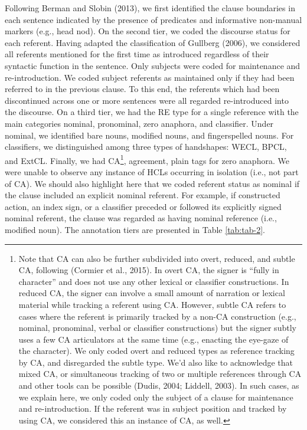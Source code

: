 \documentclass[]{elsarticle} %
\begin{document}
Following Berman and Slobin (2013), we first identified the clause
boundaries in each sentence indicated by the presence of predicates and
informative non-manual markers (e.g., head nod). On the second tier, we
coded the discourse status for each referent. Having adapted the
classification of Gullberg (2006), we considered all referents mentioned
for the first time as introduced regardless of their syntactic function
in the sentence. Only subjects were coded for maintenance and
re-introduction. We coded subject referents as maintained only if they
had been referred to in the previous clause. To this end, the referents
which had been discontinued across one or more sentences were all
regarded re-introduced into the discourse. On a third tier, we had the
RE type for a single reference with the main categories nominal,
pronominal, zero anaphora, and classifier. Under nominal, we identified
bare nouns, modified nouns, and fingerspelled nouns. For classifiers, we
distinguished among three types of handshapes: WECL, BPCL, and ExtCL.
Finally, we had CA\footnote{Note that CA can also be further subdivided
  into overt, reduced, and subtle CA, following (Cormier et al., 2015).
  In overt CA, the signer is ``fully in character'' and does not use any
  other lexical or classifier constructions. In reduced CA, the signer
  can involve a small amount of narration or lexical material while
  tracking a referent using CA. However, subtle CA refers to cases where
  the referent is primarily tracked by a non-CA construction (e.g.,
  nominal, pronominal, verbal or classifier constructions) but the
  signer subtly uses a few CA articulators at the same time (e.g.,
  enacting the eye-gaze of the character). We only coded overt and
  reduced types as reference tracking by CA, and disregarded the subtle
  type. We'd also like to acknowledge that mixed CA, or simultaneous
  tracking of two or multiple references through CA and other tools can
  be possible (Dudis, 2004; Liddell, 2003). In such cases, as we explain
  here, we only coded only the subject of a clause for maintenance and
  re-introduction. If the referent was in subject position and tracked
  by using CA, we considered this an instance of CA, as well.},
agreement, plain tags for zero anaphora. We were unable to observe any
instance of HCLs occurring in isolation (i.e., not part of CA). We
should also highlight here that we coded referent status as nominal if
the clause included an explicit nominal referent. For example, if
constructed action, an index sign, or a classifier preceded or followed
its explicitly signed nominal referent, the clause was regarded as
having nominal reference (i.e., modified noun). The annotation tiers are
presented in Table \ref{tab:tab-2}.
\end{document}
